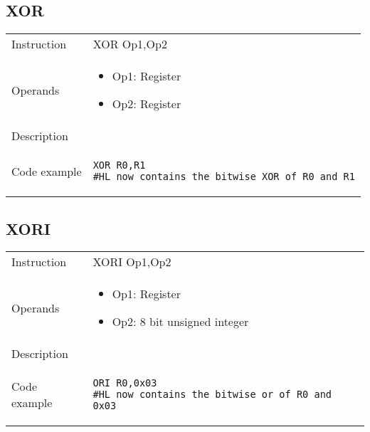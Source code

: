 \subsection{XOR}
\renewcommand*{\arraystretch}{2.0}
\begin{longtable}{P{3cm}P{9cm}}
\midrule
\noindent Instruction & XOR Op1,Op2 \\
\noindent Operands &
\begin{itemize}[label={},noitemsep,leftmargin=*,topsep=0pt,partopsep=0pt, itemsep=1em]
\item Op1: Register
\item Op2: Register
\end{itemize}\\
\noindent Description &  \\
\noindent Code example & 
\begin{lstlisting}
XOR R0,R1
#HL now contains the bitwise XOR of R0 and R1
\end{lstlisting} \\
\end{longtable}


\subsection{XORI}
\renewcommand*{\arraystretch}{2.0}
\begin{longtable}{P{3cm}P{9cm}}
\midrule
\noindent Instruction & XORI Op1,Op2 \\
\noindent Operands &
\begin{itemize}[label={},noitemsep,leftmargin=*,topsep=0pt,partopsep=0pt, itemsep=1em]
\item Op1: Register
\item Op2: 8 bit unsigned integer
\end{itemize}\\
\noindent Description &  \\
\noindent Code example & 
\begin{lstlisting}
ORI R0,0x03
#HL now contains the bitwise or of R0 and 0x03
\end{lstlisting} \\
\end{longtable}

\newpage

